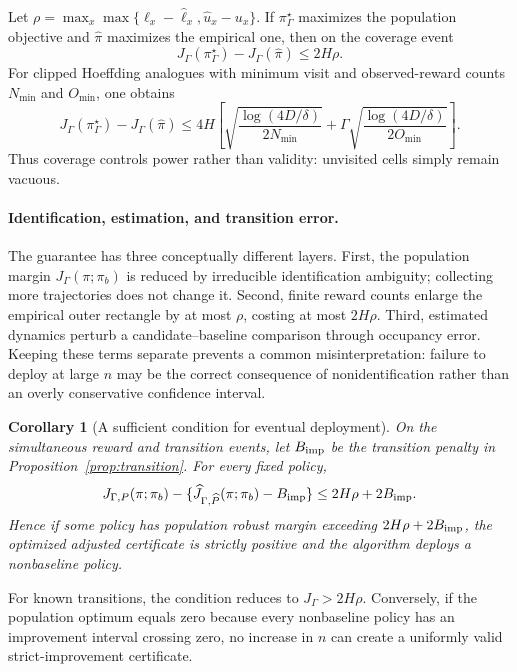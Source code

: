 \documentclass[letterpaper]{article}
\newtheorem{corollary}[theorem]{Corollary}
\theoremstyle{remark}
\begin{document}
Let $\rho=\max_x\max\{\ell_x-\widehat\ell_x,\widehat u_x-u_x\}$. If $\pi_\Gamma^\star$ maximizes the population objective and $\widehat\pi$ maximizes the empirical one, then on the coverage event
\begin{equation}
J_\Gamma(\pi_\Gamma^\star)-J_\Gamma(\widehat\pi)\leq2H\rho. \label{eq:regret}
\end{equation}
For clipped Hoeffding analogues with minimum visit and observed-reward counts $N_{\min}$ and $O_{\min}$, one obtains
\begin{equation}
J_\Gamma(\pi_\Gamma^\star)-J_\Gamma(\widehat\pi)
\leq4H\!\left[
\sqrt{\frac{\log(4D/\delta)}{2N_{\min}}}
+\Gamma\sqrt{\frac{\log(4D/\delta)}{2O_{\min}}}
\right]. \label{eq:rate}
\end{equation}
Thus coverage controls power rather than validity: unvisited cells simply remain vacuous.

\paragraph{Identification, estimation, and transition error.}
The guarantee has three conceptually different layers. First, the population margin $J_\Gamma(\pi;\pi_b)$ is reduced by irreducible identification ambiguity; collecting more trajectories does not change it. Second, finite reward counts enlarge the empirical outer rectangle by at most $\rho$, costing at most $2H\rho$. Third, estimated dynamics perturb a candidate--baseline comparison through occupancy error. Keeping these terms separate prevents a common misinterpretation: failure to deploy at large $n$ may be the correct consequence of nonidentification rather than an overly conservative confidence interval.

\begin{corollary}[A sufficient condition for eventual deployment]\label{cor:power}
On the simultaneous reward and transition events, let $B_{\rm imp}$ be the transition penalty in Proposition~\ref{prop:transition}. For every fixed policy,
\begin{equation}
J_{\Gamma,P}(\pi;\pi_b)-
\{\widehat J_{\Gamma,\widehat P}(\pi;\pi_b)-B_{\rm imp}\}
\leq 2H\rho+2B_{\rm imp}. \label{eq:power-decomposition}
\end{equation}
Hence if some policy has population robust margin exceeding $2H\rho+2B_{\rm imp}$, the optimized adjusted certificate is strictly positive and the algorithm deploys a nonbaseline policy.
\end{corollary}
For known transitions, the condition reduces to $J_\Gamma>2H\rho$. Conversely, if the population optimum equals zero because every nonbaseline policy has an improvement interval crossing zero, no increase in $n$ can create a uniformly valid strict-improvement certificate.
\end{document}
